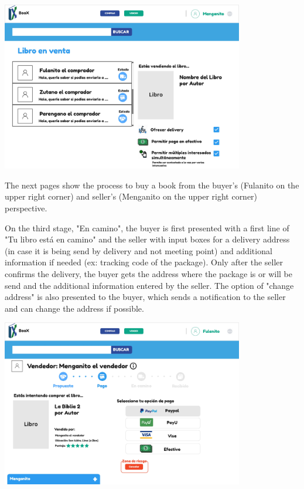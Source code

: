 \begin{center}
    \includegraphics[width=300pt]{img/mockups/Huascar Retrieval Team - Vendedor siendo contactado.jpg}
\end{center}

The next pages show the process to buy a book from the buyer's (Fulanito on the upper right corner) and seller's (Menganito on the upper right corner) perspective.

On the third stage, "En camino", the buyer is first presented with a first line of "Tu libro está en camino" and the seller with input boxes for a delivery address (in case it is being send by delivery and not meeting point) and additional information if needed (ex: tracking code of the package). Only after the seller confirms the delivery, the buyer gets the address where the package is or will be send and the additional information entered by the seller. The option of "change address" is also presented to the buyer, which sends a notification to the seller and can change the address if possible.

\begin{center}
    \includegraphics[width=300pt]{img/mockups/Huascar Retrieval Team - Contactar vendedor - Pago.jpg}
    \end{center}
